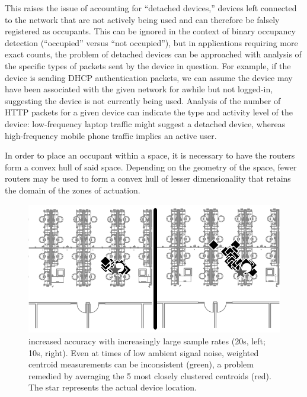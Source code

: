This raises the issue of accounting for ``detached devices,'' devices left connected to the network that are not actively being used and can therefore be falsely registered as occupants. This can be ignored in the context of binary occupancy detection (``occupied'' versus ``not occupied''), but in applications requiring more exact counts, the problem of detached devices can be approached with analysis of the specific types of packets sent by the device in question. For example, if the device is sending DHCP authentication packets, we can assume the device may have been associated with the given network for awhile but not logged-in, suggesting the device is not currently being used. Analysis of the number of HTTP packets for a given device can indicate the type and activity level of the device: low-frequency laptop traffic might suggest a detached device, whereas high-frequency mobile phone traffic implies an active user.

In order to place an occupant within a space, it is necessary to have the routers form a convex hull of said space. Depending on the geometry of the space, fewer routers may be used to form a convex hull of lesser dimensionality that retains the domain of the zones of actuation. 

\begin{figure}[htb]
\begin{center}
\includegraphics[width=.6\linewidth]{figs/samplesize}
\end{center}
\caption{increased accuracy with increasingly large sample rates (20s, left; 10s, right). Even at times of low ambient signal noise, weighted centroid measurements can be inconsistent (green), a problem remedied by averaging the 5 most closely clustered centroids (red). The star represents the actual device location.}
\end{figure}

